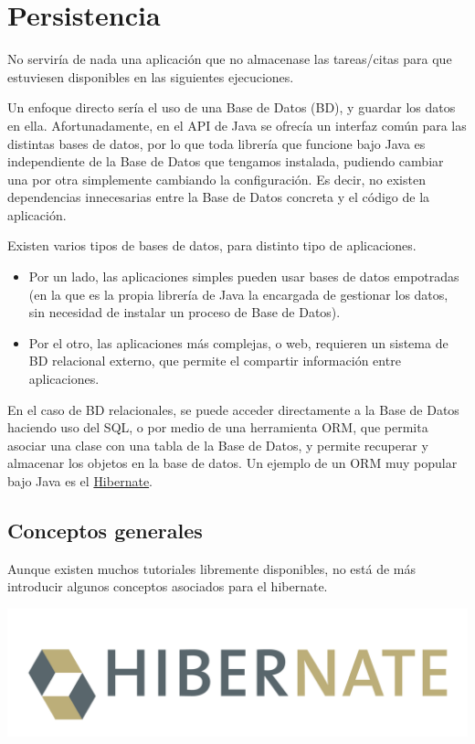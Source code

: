 \documentclass[11pt]{article}
\begin{document}
\section{Persistencia}
\label{sec-6}
\label{librerias}




No serviría de nada una aplicación que no almacenase las tareas/citas para que estuviesen disponibles en las 
siguientes ejecuciones. 


Un enfoque directo sería el uso de una Base de Datos (BD), y guardar los datos en ella.
Afortunadamente, en el API de Java se ofrecía un interfaz común para las distintas bases de datos, por lo que
toda librería que funcione bajo Java es independiente de la Base de Datos que tengamos instalada, pudiendo 
cambiar una por otra simplemente cambiando la configuración. Es decir, no existen dependencias innecesarias
entre la Base de Datos concreta y el código de la aplicación. 


Existen varios tipos de bases de datos, para distinto tipo de aplicaciones. 




\begin{itemize}
\item Por un lado, las aplicaciones simples pueden usar bases de datos empotradas (en la que es la
  propia librería de Java la encargada de gestionar los datos, sin necesidad de instalar un proceso
  de Base de Datos).
\item Por el otro, las aplicaciones más complejas, o web, requieren un sistema de BD relacional externo, que
  permite el compartir información entre aplicaciones.
\end{itemize}


En el caso de BD relacionales, se puede acceder directamente a la Base de Datos haciendo uso del
SQL, o por medio de una herramienta ORM, que permita asociar una clase con una tabla de la Base de
Datos, y permite recuperar y almacenar los objetos en la base de datos. Un ejemplo de un ORM muy
popular bajo Java es el \href{http://hibernate.org}{Hibernate}.
\subsection{Conceptos generales}
\label{sec-6-1}




Aunque existen muchos tutoriales libremente disponibles, no está de más introducir algunos conceptos
asociados para el hibernate.


\begin{center}
\includegraphics[width=.6\textwidth]{hibernate.png}
\end{center}
\end{document}
